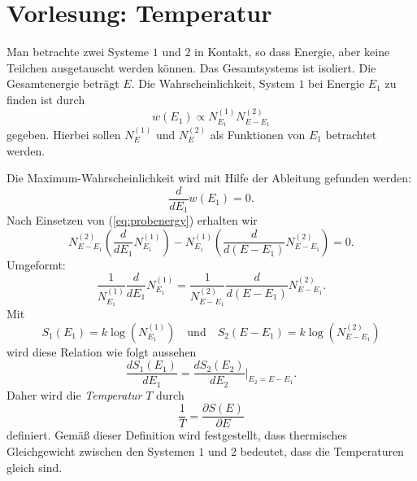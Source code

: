 
\section{Vorlesung: Temperatur}
Man betrachte zwei Systeme $1$ und $2$ in Kontakt, so dass Energie, aber keine Teilchen ausgetauscht werden können. Das Gesamtsystems ist isoliert. Die Gesamtenergie beträgt $E$. Die Wahrscheinlichkeit, System $1$ bei Energie $E_1$ zu finden ist durch
\begin{equation}\label{eq:probenergy}
	w(E_1) \propto N_{E_1}^{(1)}N_{E-E_1}^{(2)}
\end{equation}
gegeben. Hierbei sollen $N_{E}^{(1)}$ und $N_{E}^{(2)}$ als Funktionen von $E_1$ betrachtet werden. 

Die Maximum-Wahrscheinlichkeit wird mit Hilfe der Ableitung gefunden werden:
\begin{equation}
	\frac{d}{dE_1} w(E_1) = 0.
\end{equation}
Nach Einsetzen von (\ref{eq:probenergy}) erhalten wir
\begin{equation}
	N_{E-E_1}^{(2)}\left(\frac{d}{dE_1}N_{E_1}^{(1)}\right) - N_{E_1}^{(1)}\left(\frac{d}{d(E-E_1)}N_{E-E_1}^{(2)}\right) = 0.
\end{equation}
Umgeformt:
\begin{equation}
	\frac{1}{N_{E_1}^{(1)}}\frac{d}{dE_1}N_{E_1}^{(1)} =  \frac{1}{N_{E-E_1}^{(2)}}\frac{d}{d(E-E_1)}N_{E-E_1}^{(2)}.
\end{equation}
Mit 
\begin{equation}
	S_1(E_1) = k\log(N_{E_1}^{(1)})\quad \text{und} \quad S_2(E-E_1) = k\log(N_{E-E_1}^{(2)})
\end{equation}
wird diese Relation wie folgt aussehen
\begin{equation}
	\frac{dS_1(E_1)}{dE_1} = \frac{dS_2(E_2)}{dE_2}\bigg|_{E_2 = E-E_1}.
\end{equation}
Daher wird die \emph{Temperatur} $T$ durch 
\begin{equation}
	\frac{1}{T} = \frac{\partial S(E)}{\partial E}
\end{equation}
definiert. Gemäß dieser Definition wird festgestellt, dass thermisches Gleichgewicht zwischen den Systemen $1$ und $2$ bedeutet, dass die Temperaturen gleich sind.